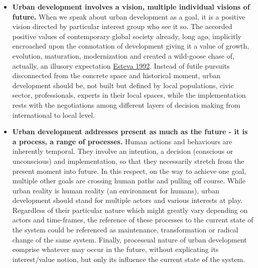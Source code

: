 \documentclass[11pt]{report}
\begin{document}
{\begin{itemize}
\item \textbf{Urban development involves a vision, multiple individual visions of future.}
When we speak about urban development as a goal, it is a positive vision directed by particular interest group who see it so.
The accorded positive values of contemporary global society already, long ago, implicitly encroached upon the connotation of development giving it a value of growth, evolution, maturation, modernization and created a wild-goose chase of, actually, an illusory expectation
\href{}{Esteva 1992}.
Instead of futile pursuits disconnected from the concrete space and historical moment, urban development should be, not built but defined by local populations, civic sector, professionals, experts in their local spaces, while the implementation rests with the negotiations among different layers of decision making from international to local level.

\item \textbf{Urban development addresses present as much as the future - it is a process, a range of processes.}
Human actions and behaviours are inherently temporal.
They involve an intention, a decision (conscious or unconscious) and implementation, so that they necessarily stretch from the present moment into future. In this respect, on the way to achieve one goal, multiple other goals are crossing human paths and pulling off course.
While urban reality is human reality (an environment for humans), urban development should stand for multiple actors and various interests at play.
Regardless of their particular nature which might greatly vary depending on actors and time-frames, the reference of these processes to the current state of the system could be referenced as maintenance, transformation or radical change of the same system.
Finally, processual nature of urban development comprise whatever may occur in the future, without explicating its interest/value notion, but only its influence the current state of the system.


\end{itemize}}
\end{document}
